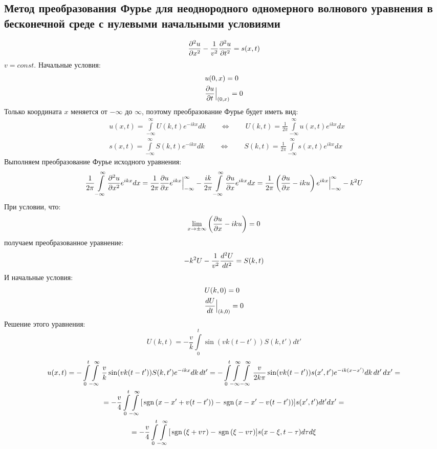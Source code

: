 \subsection{Метод преобразования Фурье для неоднородного одномерного волнового уравнения в бесконечной среде с нулевыми начальными условиями}

\[
\frac{\partial^2 u}{\partial x^2} - \frac{1}{v^2} \frac{\partial^2 u}{\partial t^2} = s(x, t)
\]
$v = const$. Начальные условия:
\[
	\begin{aligned}
	& u(0, x) = 0 \\
	& \frac{\partial u}{\partial t} \Big|_{(0, x)} = 0
	\end{aligned}
\]
Только координата $x$ меняется от $-\infty$ до $\infty$, поэтому преобразование Фурье будет иметь вид:
\[
	\begin{aligned}
	& u(x, t) = \int\limits_{-\infty}^{\infty} U(k, t) e^{-ikx} dk \qquad\Leftrightarrow \qquad  U(k, t) = \frac{1}{2\pi}\int\limits_{-\infty}^{\infty} u(x, t) e^{ikx} dx\\
	& s(x, t) = \int\limits_{-\infty}^{\infty} S(k, t) e^{-ikx} dk
	\qquad\Leftrightarrow \qquad
	S(k, t) = \frac{1}{2\pi}\int\limits_{-\infty}^{\infty} s(x, t) e^{ikx} dx
	\end{aligned}
\]
Выполняем преобразование Фурье исходного уравнения:
\[
	\frac{1}{2\pi} \int\limits_{-\infty}^{\infty}\frac{\partial^2 u}{\partial x^2} e^{ikx} dx = 
	\frac{1}{2\pi} \frac{\partial u}{\partial x} e^{ikx} \Big|_{-\infty}^{\infty} - 
	\frac{ik}{2\pi} \int\limits_{-\infty}^{\infty}\frac{\partial u}{\partial x} e^{ikx} dx =
	\frac{1}{2\pi} \left(\frac{\partial u}{\partial x} - ik u \right) e^{ikx} \Big|_{-\infty}^{\infty}
	- k^2 U
\]
При условии, что:
\[
	 \lim\limits_{x \to \pm \infty }\left(\frac{\partial u}{\partial x} - ik u \right) = 0
\]
получаем преобразованное уравнение:
\[
	- k^2 U - \frac{1}{v^2} \frac{d^2 U}{d t^2} = S(k, t)
\]
И начальные условия:
\[
	\begin{aligned}
	& U(k, 0) = 0 \\
	& \frac{d U}{d t} \Big|_{(k, 0)} = 0
	\end{aligned}
\]
Решение этого уравнения:
\[
	U(k, t) = - \frac{v}{k} \int\limits_{0}^{t} \sin(vk (t - t')) S(k, t') dt'
\]
\[
	\begin{gathered}
	u(x, t) = -\int\limits_{0}^{t} \! \int\limits_{-\infty}^{\infty} \frac{v}{k} \sin(vk (t - t')) S(k, t') e^{-ikx}  dk\, dt' =
	-\int\limits_{0}^{t} \! \int\limits_{-\infty}^{\infty} \! \int\limits_{-\infty}^{\infty} \frac{v}{2k\pi} \sin(vk (t - t')) s(x', t') e^{-ik(x - x')}  dk\, dt'\, dx' = \\ =
	-\frac{v}{4} \int\limits_{0}^{t}  \! \int\limits_{-\infty}^{\infty} [ \mathrm{\,sgn}\, (x - x' + v(t - t')) - \mathrm{\,sgn}\, (x - x' - v (t - t')) ] s(x', t') dt' dx' = \\ =
	-\frac{v}{4} \int\limits_{0}^{t} \! \int\limits_{-\infty}^{\infty} [ \mathrm{\,sgn}\, (\xi + v \tau) - \mathrm{\,sgn}\, (\xi - v\tau) ] s(x - \xi, t - \tau) d\tau d\xi 
	\end{gathered}
\]
